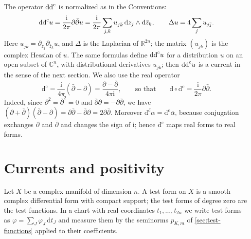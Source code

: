 The operator $\mathrm{dd}^{\mathrm{c}}$ is normalized as in the Conventions:
\begin{equation}\label{eq:complex-hessian-normalization}
 \mathrm{dd}^{\mathrm{c}} u=\frac{\mathrm{i}}{2\pi}\partial\bar\partial u
 =\frac{\mathrm{i}}{2\pi}\sum_{j,k}u_{j\bar k}\,\mathrm{d}z_j\wedge\mathrm{d}\bar z_k,
 \qquad \Delta u=4\sum_j u_{j\bar j}.
\end{equation}
Here $u_{j\bar k}=\partial_{z_j}\partial_{\bar z_k}u$, and $\Delta$ is the Laplacian of $\mathbb R^{2n}$; the matrix $(u_{j\bar k})$ is the complex Hessian of $u$. The same formulas define $\mathrm{dd}^{\mathrm{c}} u$ for a distribution $u$ on an open subset of $\mathbb C^n$, with distributional derivatives $u_{j\bar k}$; then $\mathrm{dd}^{\mathrm{c}} u$ is a current in the sense of the next section. We also use the real operator
\begin{equation}\label{eq:dc-operator}
 \mathrm d^{\mathrm c}=\frac{\mathrm{i}}{4\pi}(\bar\partial-\partial)=\frac{\partial-\bar\partial}{4\pi\mathrm{i}},
 \qquad\text{so that}\qquad
 \mathrm d\circ\mathrm d^{\mathrm c}=\frac{\mathrm{i}}{2\pi}\partial\bar\partial.
\end{equation}
Indeed, since $\partial^2=\bar\partial^2=0$ and $\bar\partial\partial=-\partial\bar\partial$, we have $(\partial+\bar\partial)(\bar\partial-\partial)=\partial\bar\partial-\bar\partial\partial=2\partial\bar\partial$. Moreover $\overline{\mathrm d^{\mathrm c}\alpha}=\mathrm d^{\mathrm c}\bar\alpha$, because conjugation exchanges $\partial$ and $\bar\partial$ and changes the sign of $\mathrm{i}$; hence $\mathrm d^{\mathrm c}$ maps real forms to real forms.

\section{Currents and positivity}
\label{sec:positive-currents}

Let $X$ be a complex manifold of dimension $n$. A test form on $X$ is a smooth complex differential form with compact support; the test forms of degree zero are the test functions. In a chart with real coordinates $t_1,\ldots,t_{2n}$ we write test forms as $\varphi=\sum_J\varphi_J\,\mathrm dt_J$ and measure them by the seminorms $p_{K,m}$ of \cref{sec:test-functions} applied to their coefficients.

